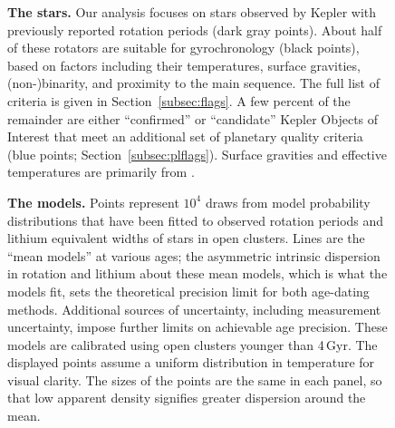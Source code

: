 \documentclass[11pt,twocolumn,tighten]{aastex63}
\begin{document}
\begin{figure}[!t]
  \begin{center}
% 
  \end{center}
  \vspace{-0.5cm}
  \caption{
    {\bf The stars.}  Our analysis focuses on stars observed
    by Kepler with previously reported rotation periods (dark gray
    points).  About half of these rotators are suitable for
    gyrochronology (black points), based on factors including their
    temperatures, surface gravities, (non-)binarity, and proximity to
    the main sequence.  The full list of criteria is given in
    Section~\ref{subsec:flags}.  A few percent of the remainder are
    either ``confirmed'' or ``candidate'' Kepler Objects of Interest
    that meet an additional set of planetary quality criteria (blue points;
    Section~\ref{subsec:plflags}).  
    Surface gravities and effective
    temperatures are primarily from
    \citet{Berger_2020a_catalog}.
  }
  \label{fig:stellarprops}
\end{figure}

\begin{figure}[!t]
  \begin{center}
    \leavevmode
  \end{center}
  \vspace{-0.6cm}
  \caption{
    {\bf The models.}
    Points represent $10^4$ draws from model probability distributions
    that have been fitted to observed rotation periods
    \citep{Bouma_2023} and lithium equivalent widths
    \citep[EWs;][]{Jeffries_2023} of stars in open clusters.  Lines
    are the ``mean models'' at various ages; the asymmetric intrinsic
    dispersion in rotation and lithium about these mean models, which
    is what the models fit, sets the theoretical precision limit for
    both age-dating methods.    Additional sources of uncertainty,
    including measurement uncertainty, impose further limits on
    achievable age precision.  These models are calibrated using open
    clusters younger than 4\,Gyr.  The displayed points assume a
    uniform distribution in temperature for visual clarity.
    The sizes of the points are the same in each panel, so that low
    apparent density signifies greater dispersion around the mean.
    \label{fig:models}
  }
\end{figure}
\end{document}
